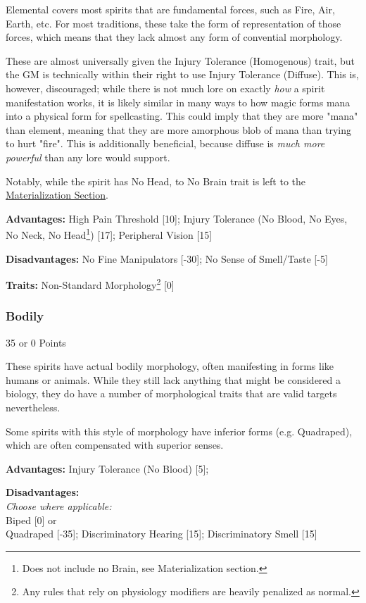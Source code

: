\begin{multicols*}{3}
	Elemental covers most spirits that are fundamental forces, such as Fire, Air, Earth, etc. For most traditions, these take the form of representation of those forces, which means that they lack almost any form of convential morphology.
	
	These are almost universally given the Injury Tolerance (Homogenous) trait, but the GM is technically within their right to use Injury Tolerance (Diffuse). This is, however, discouraged; while there is not much lore on exactly \textit{how} a spirit manifestation works, it is likely similar in many ways to how magic forms mana into a physical form for spellcasting. This could imply that they are more "mana" than element, meaning that they are more amorphous blob of mana than trying to hurt "fire". This is additionally beneficial, because diffuse is \textit{much more powerful} than any lore would support.
	
	Notably, while the spirit has No Head, to No Brain trait is left to the \hyperref[materialization]{Materialization Section}.
	
	\textbf{Advantages:} 
	High Pain Threshold [10]; Injury Tolerance (No Blood, No Eyes, No Neck, No Head\footnote{Does not include no Brain, see Materialization section.}) [17]; Peripheral Vision [15]
	
	\textbf{Disadvantages:}
	No Fine Manipulators [-30]; No Sense of Smell/Taste [-5]
	
	\textbf{Traits:}
	Non-Standard Morphology\footnote{Any rules that rely on physiology modifiers are heavily penalized as normal.} [0]
	
	\subsubsection*{Bodily}\label{bodily}
	\begin{flushright}
		35 or 0 Points
	\end{flushright}
	
	These spirits have actual bodily morphology, often manifesting in forms like humans or animals. While they still lack anything that might be considered a biology, they do have a number of morphological traits that are valid targets nevertheless.
	
	Some spirits with this style of morphology have inferior forms (e.g. Quadraped), which are often compensated with superior senses.
	
	\textbf{Advantages:} 
	Injury Tolerance (No Blood) [5];
	
	\textbf{Disadvantages:}
	\textit{\\Choose where applicable:\\}
	Biped [0] or\\
	Quadraped [-35]; Discriminatory Hearing [15]; Discriminatory Smell [15]\\
	

\end{multicols*}
